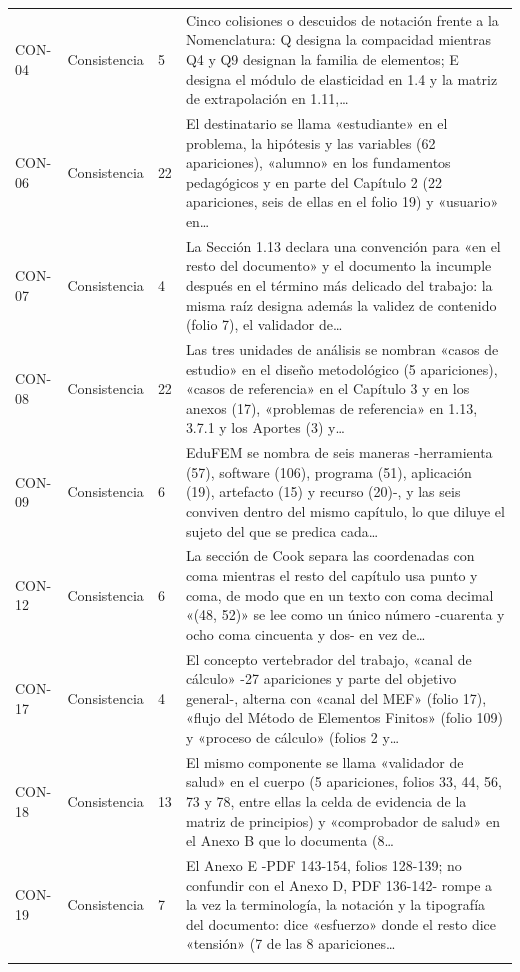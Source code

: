 {\begin{longtable}{@{}L{1.4cm}L{2.6cm}L{1.2cm}L{10.05cm}@{}}
CON-04 & Consistencia & 5 & Cinco colisiones o descuidos de notación frente a la Nomenclatura: Q designa la compacidad mientras Q4 y Q9 designan la familia de elementos; E designa el módulo de elasticidad en 1.4 y la matriz de extrapolación en 1.11,…\\\addlinespace[2pt]
CON-06 & Consistencia & 22 & El destinatario se llama «estudiante» en el problema, la hipótesis y las variables (62 apariciones), «alumno» en los fundamentos pedagógicos y en parte del Capítulo 2 (22 apariciones, seis de ellas en el folio 19) y «usuario» en…\\\addlinespace[2pt]
CON-07 & Consistencia & 4 & La Sección 1.13 declara una convención para «en el resto del documento» y el documento la incumple después en el término más delicado del trabajo: la misma raíz designa además la validez de contenido (folio 7), el validador de…\\\addlinespace[2pt]
CON-08 & Consistencia & 22 & Las tres unidades de análisis se nombran «casos de estudio» en el diseño metodológico (5 apariciones), «casos de referencia» en el Capítulo 3 y en los anexos (17), «problemas de referencia» en 1.13, 3.7.1 y los Aportes (3) y…\\\addlinespace[2pt]
CON-09 & Consistencia & 6 & EduFEM se nombra de seis maneras -herramienta (57), software (106), programa (51), aplicación (19), artefacto (15) y recurso (20)-, y las seis conviven dentro del mismo capítulo, lo que diluye el sujeto del que se predica cada…\\\addlinespace[2pt]
CON-12 & Consistencia & 6 & La sección de Cook separa las coordenadas con coma mientras el resto del capítulo usa punto y coma, de modo que en un texto con coma decimal «(48, 52)» se lee como un único número -cuarenta y ocho coma cincuenta y dos- en vez de…\\\addlinespace[2pt]
CON-17 & Consistencia & 4 & El concepto vertebrador del trabajo, «canal de cálculo» -27 apariciones y parte del objetivo general-, alterna con «canal del MEF» (folio 17), «flujo del Método de Elementos Finitos» (folio 109) y «proceso de cálculo» (folios 2 y…\\\addlinespace[2pt]
CON-18 & Consistencia & 13 & El mismo componente se llama «validador de salud» en el cuerpo (5 apariciones, folios 33, 44, 56, 73 y 78, entre ellas la celda de evidencia de la matriz de principios) y «comprobador de salud» en el Anexo B que lo documenta (8…\\\addlinespace[2pt]
CON-19 & Consistencia & 7 & El Anexo E -PDF 143-154, folios 128-139; no confundir con el Anexo D, PDF 136-142- rompe a la vez la terminología, la notación y la tipografía del documento: dice «esfuerzo» donde el resto dice «tensión» (7 de las 8 apariciones…\\\addlinespace[2pt]

\end{longtable}}
